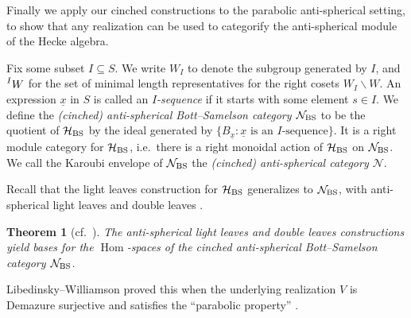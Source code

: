 \documentclass{amsart}
\theoremstyle{plain}
\newtheorem{thm}{Theorem}[section]
\theoremstyle{definition}
\theoremstyle{remark}
\numberwithin{equation}{section}
\newcommand{\defnemph}[1]{\emph{#1}}
\DeclareMathOperator{\Hom}{Hom}
\begin{document}
Finally we apply our cinched constructions to the parabolic anti-spherical setting, to show that any realization can be used to categorify the anti-spherical module of the Hecke algebra. 

Fix some subset $I \subseteq S$. 
We write $W_I$ to denote the subgroup generated by $I$, and $\prescript{I}{}{W}$ for the set of minimal length representatives for the right cosets $W_I \backslash W$. 
An expression $\underline{x}$ in $S$ is called an \defnemph{$I$-sequence} if it starts with some element $s \in I$. 
We define the \defnemph{(cinched) anti-spherical Bott--Samelson category $\mathcal{N}_{\rm BS}$} to be the quotient of $\mathcal{H}_{\rm BS}$ by the ideal generated by $\{B_{\underline{x}} : \underline{x} \text{ is an $I$-sequence}\}$.
It is a right module category for $\mathcal{H}_{\rm BS}$, i.e.~there is a right monoidal action of $\mathcal{H}_{\rm BS}$ on $\mathcal{N}_{\rm BS}$. 
We call the Karoubi envelope of $\mathcal{N}_{\rm BS}$ the \defnemph{(cinched) anti-spherical category $\mathcal{N}$}. 

Recall that the light leaves construction for $\mathcal{H}_{\rm BS}$ generalizes to $\mathcal{N}_{\rm BS}$, with anti-spherical light leaves and double leaves \cite[Definition~5.1]{LW-antispher}.


\begin{thm}[{cf.~\cite[Theorem~5.3]{LW-antispher}}] \label{thm:antispherLLbasis}
The anti-spherical light leaves and double leaves constructions yield bases for the $\Hom$-spaces of the cinched anti-spherical Bott--Samelson category $\mathcal{N}_{\rm BS}$.
\end{thm}


Libedinsky--Williamson proved this when the underlying realization $V$ is Demazure surjective and satisfies the ``parabolic property'' \cite[\S 2.3]{LW-antispher}.
\end{document}
